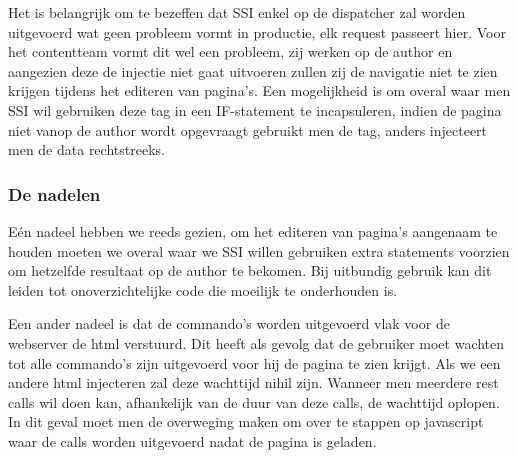 \documentclass{article}
\begin{document}
    \par
    Het is belangrijk om te bezeffen dat SSI enkel op de dispatcher zal worden uitgevoerd wat geen probleem vormt in productie, elk request passeert hier. Voor het contentteam vormt dit wel een probleem, zij werken op de author en aangezien deze de injectie niet gaat uitvoeren zullen zij de navigatie niet te zien krijgen tijdens het editeren van pagina's. Een mogelijkheid is om overal waar men SSI wil gebruiken deze tag in een IF-statement te incapsuleren, indien de pagina niet vanop de author wordt opgevraagt gebruikt men de tag, anders injecteert men de data rechtstreeks.
	\subsubsection{De nadelen}
    E\'en nadeel hebben we reeds gezien, om het editeren van pagina's aangenaam te houden moeten we overal waar we SSI willen gebruiken extra statements voorzien om hetzelfde resultaat op de author te bekomen. Bij uitbundig gebruik kan dit leiden tot onoverzichtelijke code die moeilijk te onderhouden is.
    \par
    Een ander nadeel is dat de commando's worden uitgevoerd vlak voor de webserver de html verstuurd. Dit heeft als gevolg dat de gebruiker moet wachten tot alle commando's zijn uitgevoerd voor hij de pagina te zien krijgt. Als we een andere html injecteren zal deze wachttijd nihil zijn. Wanneer men meerdere rest calls wil doen kan, afhankelijk van de duur van deze calls, de wachttijd oplopen. In dit geval moet men de overweging maken om over te stappen op javascript waar de calls worden uitgevoerd nadat de pagina is geladen. 
\end{document}
